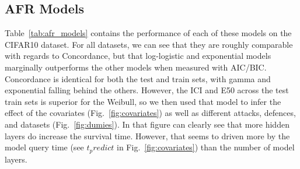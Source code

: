 \subsection{AFR Models}

Table~\ref{tab:afr_models} contains the performance of each of these models on the CIFAR10 dataset. For all datasets, we can see that they are roughly comparable with regards to Concordance, but that log-logistic and exponential models marginally outperforms the other models when measured with AIC/BIC. Concordance is identical for both the test and train sets, with gamma and exponential falling behind the others. However, the ICI and E50 across the test train sets is superior for the Weibull, so we then used that model to infer the effect of the covariates (Fig.~\ref{fig:covariates}) as well as different attacks, defences, and datasets (Fig.~\ref{fig:dumies}). In that figure can clearly see that more hidden layers do increase the survival time. However, that seems to driven more by the model query time (see $t_predict$ in Fig.~\ref{fig:covariates}) than the number of model layers.

